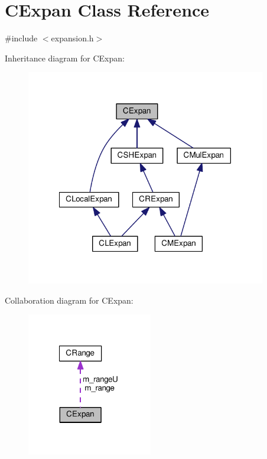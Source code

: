 \hypertarget{classCExpan}{\section{C\-Expan Class Reference}
\label{classCExpan}
}


{\ttfamily \#include $<$expansion.\-h$>$}



Inheritance diagram for C\-Expan\-:\nopagebreak
\begin{figure}[H]
\begin{center}
\leavevmode
\includegraphics[width=297pt]{classCExpan__inherit__graph}
\end{center}
\end{figure}


Collaboration diagram for C\-Expan\-:\nopagebreak
\begin{figure}[H]
\begin{center}
\leavevmode
\includegraphics[width=155pt]{classCExpan__coll__graph}
\end{center}
\end{figure}
